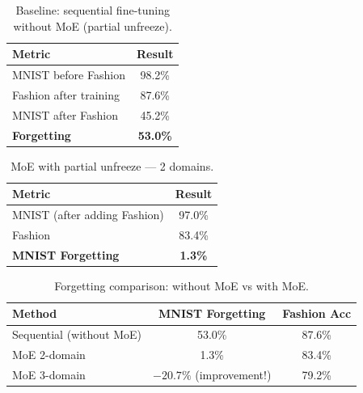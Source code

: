 \begin{table}[h]
\centering
\caption{Baseline: sequential fine-tuning without MoE (partial unfreeze).}
\begin{tabular}{l c}
\hline
\textbf{Metric} & \textbf{Result} \\
\hline
MNIST before Fashion & 98.2\% \\
Fashion after training & 87.6\% \\
MNIST after Fashion & 45.2\% \\
\textbf{Forgetting} & \textbf{53.0\%} \\
\hline
\end{tabular}
\end{table}

\begin{table}[h]
\centering
\caption{MoE with partial unfreeze --- 2 domains.}
\begin{tabular}{l c}
\hline
\textbf{Metric} & \textbf{Result} \\
\hline
MNIST (after adding Fashion) & 97.0\% \\
Fashion & 83.4\% \\
\textbf{MNIST Forgetting} & \textbf{1.3\%} \\
\hline
\end{tabular}
\end{table}

\begin{table}[h]
\centering
\caption{Forgetting comparison: without MoE vs with MoE.}
\begin{tabular}{l c c}
\hline
\textbf{Method} & \textbf{MNIST Forgetting} & \textbf{Fashion Acc} \\
\hline
Sequential (without MoE) & 53.0\% & 87.6\% \\
MoE 2-domain & 1.3\% & 83.4\% \\
MoE 3-domain & $-20.7\%$ (improvement!) & 79.2\% \\
\hline
\end{tabular}
\end{table}
